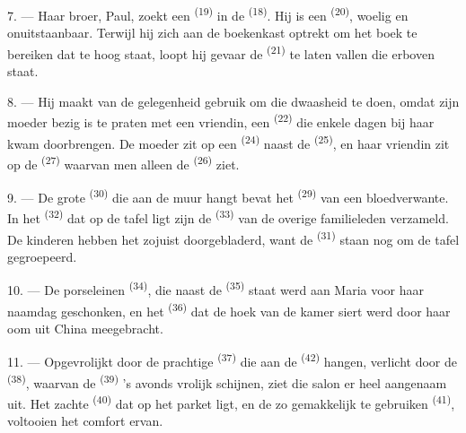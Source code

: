 \VUsaut{5.0mm}
\VUsaut{3.0mm}

7. --- Haar broer, Paul, zoekt een  \textsuperscript{(19)} in de
 \textsuperscript{(18)}. Hij is een 
\textsuperscript{(20)}, woelig en onuitstaanbaar. Terwijl hij zich aan de boekenkast optrekt
om het boek te bereiken dat te hoog staat, loopt hij gevaar de 
\textsuperscript{(21)} te laten vallen die erboven staat.

8. --- Hij maakt van de gelegenheid gebruik om die dwaasheid te doen, omdat zijn moeder bezig
is te praten met een vriendin, een  \textsuperscript{(22)} die enkele dagen bij
haar kwam doorbrengen. De moeder zit op een  \textsuperscript{(24)} naast de
 \textsuperscript{(25)}, en haar vriendin zit op de 
\textsuperscript{(27)} waarvan men alleen de  \textsuperscript{(26)} ziet.

9. --- De grote  \textsuperscript{(30)} die aan de muur hangt bevat het
 \textsuperscript{(29)} van een bloedverwante. In het
 \textsuperscript{(32)} dat op de tafel ligt zijn de
 \textsuperscript{(33)} van de overige familieleden verzameld. De
kinderen hebben het zojuist doorgebladerd, want de  \textsuperscript{(31)}
staan nog om de tafel gegroepeerd.

10. --- De porseleinen  \textsuperscript{(34)}, die naast de
 \textsuperscript{(35)} staat werd aan Maria voor haar
naamdag geschonken, en het  \textsuperscript{(36)} dat de hoek van de
kamer siert werd door haar oom uit China meegebracht.

11. --- Opgevrolijkt door de prachtige  \textsuperscript{(37)} die aan de
 \textsuperscript{(42)} hangen, verlicht door de 
\textsuperscript{(38)}, waarvan de
 \textsuperscript{(39)} 's avonds vrolijk schijnen,
ziet die salon er heel aangenaam uit. Het zachte  \textsuperscript{(40)} dat op
het parket ligt, en de zo gemakkelijk te gebruiken
 \textsuperscript{(41)}, voltooien het comfort ervan.

\VUsaut{3.6mm}
\VUsaut{3.0mm}

